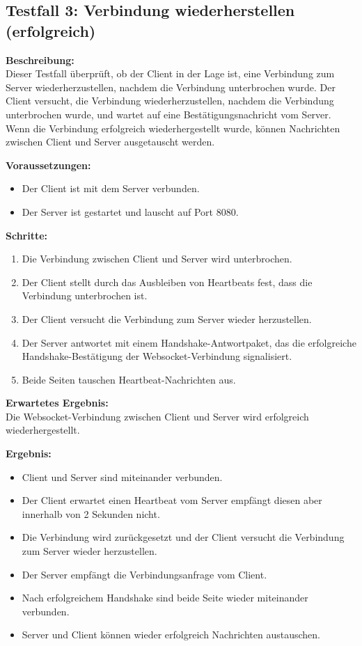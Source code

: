 \documentclass[thesis.tex]{subfiles}
\begin{document}
\subsection*{Testfall 3: Verbindung wiederherstellen (erfolgreich)}

\textbf{Beschreibung:}\\
Dieser Testfall überprüft, ob der Client in der Lage ist, eine Verbindung zum Server wiederherzustellen, nachdem die Verbindung unterbrochen wurde. Der Client versucht, die Verbindung wiederherzustellen, nachdem die Verbindung unterbrochen wurde, und wartet auf eine Bestätigungsnachricht vom Server. Wenn die Verbindung erfolgreich wiederhergestellt wurde, können Nachrichten zwischen Client und Server ausgetauscht werden.

\textbf{Voraussetzungen:}
\begin{itemize}
    \item Der Client ist mit dem Server verbunden.
    \item Der Server ist gestartet und lauscht auf Port 8080.
\end{itemize}

\textbf{Schritte:}
\begin{enumerate}
    \item Die Verbindung zwischen Client und Server wird unterbrochen.
    \item Der Client stellt durch das Ausbleiben von Heartbeats fest, dass die Verbindung unterbrochen ist.
    \item Der Client versucht die Verbindung zum Server wieder herzustellen.
    \item Der Server antwortet mit einem Handshake-Antwortpaket, das die erfolgreiche\\ Handshake-Bestätigung der Websocket-Verbindung signalisiert.
    \item Beide Seiten tauschen Heartbeat-Nachrichten aus.
\end{enumerate}

\textbf{Erwartetes Ergebnis:}\\
Die Websocket-Verbindung zwischen Client und Server wird erfolgreich wiederhergestellt.

\textbf{Ergebnis:}
\begin{itemize}
    \item Client und Server sind miteinander verbunden.
    \item Der Client erwartet einen Heartbeat vom Server empfängt diesen aber innerhalb von 2 Sekunden nicht.
    \item Die Verbindung wird zurückgesetzt und der Client versucht die Verbindung zum Server wieder herzustellen.
    \item Der Server empfängt die Verbindungsanfrage vom Client.
    \item Nach erfolgreichem Handshake sind beide Seite wieder miteinander verbunden.
    \item Server und Client können wieder erfolgreich Nachrichten austauschen.
\end{itemize}
\end{document}
